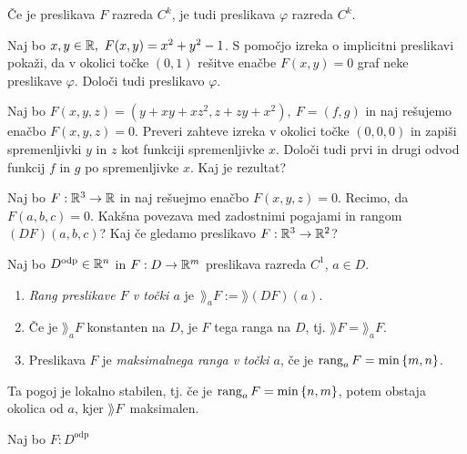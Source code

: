 \begin{posledica}
    Če je preslikava $F$ razreda $C^k$, je tudi preslikava $\varphi$ razreda $C^k$.
\end{posledica}

\begin{zgled}
    Naj bo $x,y \in \mathbb{R}, \ F(x, y) = x^2 + y^2 -1$. S pomočjo izreka o implicitni preslikavi pokaži, da v okolici točke $(0,1)$ rešitve enačbe $F(x,y) = 0$ graf neke preslikave $\varphi$. Določi tudi preslikavo $\varphi$.
\end{zgled}

\begin{zgled}
    Naj bo $F(x,y,z) = (y + xy+xz^2, z+zy+x^2), \ F = (f, g)$ in naj rešujemo enačbo $F(x,y,z) = 0$. Preveri zahteve izreka v okolici točke $(0,0,0)$ in zapiši spremenljivki $y$ in $z$ kot funkciji spremenljivke $x$. Določi tudi prvi in drugi odvod funkcij $f$ in $g$ po spremenljivke $x$. Kaj je rezultat?
\end{zgled}

\begin{zgled}
    Naj bo $F: \mathbb{R}^3 \to \mathbb{R}$ in naj rešuejmo enačbo $F(x,y,z) = 0$. Recimo, da $F(a,b,c) = 0$. Kakšna povezava med zadostnimi pogajami in rangom $(DF)(a,b,c)$? Kaj če gledamo preslikavo $F: \mathbb{R}^3 \to \mathbb{R}^2$?
\end{zgled}

\begin{definicija}
    Naj bo $D^\text{odp} \in \mathbb{R}^n$ in $F: D \to \mathbb{R}^m$ preslikava razreda $C^1$, $a \in D$. 
    \begin{enumerate}
        \item \emph{Rang preslikave $F$ v točki $a$} je~$\rang_aF := \rang (DF)(a)$.
        \item Če je $\rang_aF$ konstanten na $D$, je $F$ tega ranga na $D$, tj. $\rang F = \rang_aF$.
        \item Preslikava $F$ je \emph{maksimalnega ranga v točki $a$}, če je $\operatorname{rang}_aF = \min \left\{m, n\right\}$.
    \end{enumerate}      
\end{definicija}

\begin{opomba}
    Ta pogoj je lokalno stabilen, tj. če je $\operatorname{rang}_aF = \min \left\{n, m\right\}$, potem obstaja okolica od $a$, kjer $\rang F$~maksimalen.
\end{opomba}

\begin{posledica}
    Naj bo $F: D^\text{odp}$
\end{posledica}